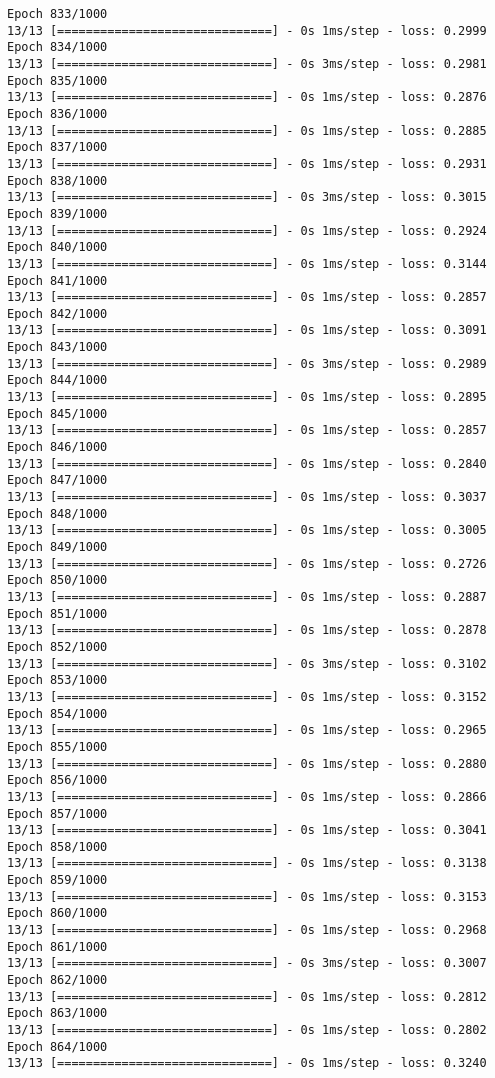 \documentclass[11pt]{article}
\begin{document}
\begin{Verbatim}[commandchars=\\\{\}]
Epoch 833/1000
13/13 [==============================] - 0s 1ms/step - loss: 0.2999
Epoch 834/1000
13/13 [==============================] - 0s 3ms/step - loss: 0.2981
Epoch 835/1000
13/13 [==============================] - 0s 1ms/step - loss: 0.2876
Epoch 836/1000
13/13 [==============================] - 0s 1ms/step - loss: 0.2885
Epoch 837/1000
13/13 [==============================] - 0s 1ms/step - loss: 0.2931
Epoch 838/1000
13/13 [==============================] - 0s 3ms/step - loss: 0.3015
Epoch 839/1000
13/13 [==============================] - 0s 1ms/step - loss: 0.2924
Epoch 840/1000
13/13 [==============================] - 0s 1ms/step - loss: 0.3144
Epoch 841/1000
13/13 [==============================] - 0s 1ms/step - loss: 0.2857
Epoch 842/1000
13/13 [==============================] - 0s 1ms/step - loss: 0.3091
Epoch 843/1000
13/13 [==============================] - 0s 3ms/step - loss: 0.2989
Epoch 844/1000
13/13 [==============================] - 0s 1ms/step - loss: 0.2895
Epoch 845/1000
13/13 [==============================] - 0s 1ms/step - loss: 0.2857
Epoch 846/1000
13/13 [==============================] - 0s 1ms/step - loss: 0.2840
Epoch 847/1000
13/13 [==============================] - 0s 1ms/step - loss: 0.3037
Epoch 848/1000
13/13 [==============================] - 0s 1ms/step - loss: 0.3005
Epoch 849/1000
13/13 [==============================] - 0s 1ms/step - loss: 0.2726
Epoch 850/1000
13/13 [==============================] - 0s 1ms/step - loss: 0.2887
Epoch 851/1000
13/13 [==============================] - 0s 1ms/step - loss: 0.2878
Epoch 852/1000
13/13 [==============================] - 0s 3ms/step - loss: 0.3102
Epoch 853/1000
13/13 [==============================] - 0s 1ms/step - loss: 0.3152
Epoch 854/1000
13/13 [==============================] - 0s 1ms/step - loss: 0.2965
Epoch 855/1000
13/13 [==============================] - 0s 1ms/step - loss: 0.2880
Epoch 856/1000
13/13 [==============================] - 0s 1ms/step - loss: 0.2866
Epoch 857/1000
13/13 [==============================] - 0s 1ms/step - loss: 0.3041
Epoch 858/1000
13/13 [==============================] - 0s 1ms/step - loss: 0.3138
Epoch 859/1000
13/13 [==============================] - 0s 1ms/step - loss: 0.3153
Epoch 860/1000
13/13 [==============================] - 0s 1ms/step - loss: 0.2968
Epoch 861/1000
13/13 [==============================] - 0s 3ms/step - loss: 0.3007
Epoch 862/1000
13/13 [==============================] - 0s 1ms/step - loss: 0.2812
Epoch 863/1000
13/13 [==============================] - 0s 1ms/step - loss: 0.2802
Epoch 864/1000
13/13 [==============================] - 0s 1ms/step - loss: 0.3240

\end{Verbatim}
\end{document}
